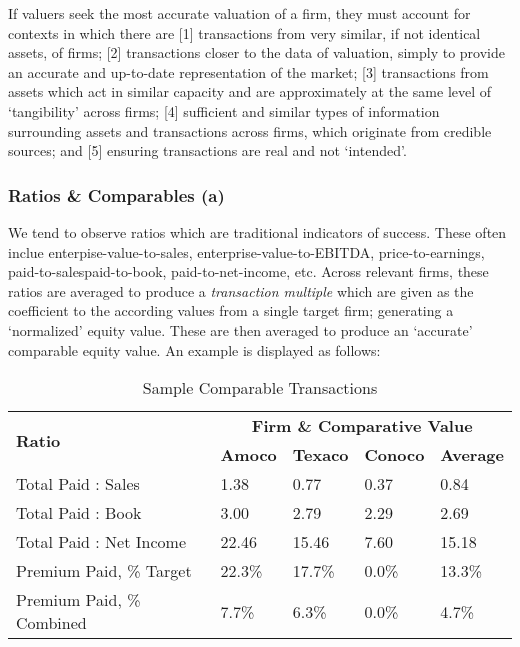 \documentclass[11pt, english]{article}
\begin{document}
	If valuers seek the most accurate valuation of a firm, they must account for contexts in which there are [1] transactions from very similar, if not identical assets, of firms; [2] transactions closer to the data of valuation, simply to provide an accurate and up-to-date representation of the market; [3] transactions from assets which act in similar capacity and are approximately at the same level of `tangibility' across firms; [4] sufficient and similar types of information surrounding assets and transactions across firms, which originate from credible sources; and [5] ensuring transactions are real and not `intended'.

		\subsubsection*{Ratios \& Comparables (a)}
	
	We tend to observe ratios which are traditional indicators of success. These often inclue enterpise-value-to-sales, enterprise-value-to-EBITDA, price-to-earnings, paid-to-salespaid-to-book, paid-to-net-income, etc. Across relevant firms, these ratios are averaged to produce a \textit{transaction multiple} which are given as the coefficient to the according values from a single target firm; generating a `normalized' equity value. These are then averaged to produce an `accurate' comparable equity value. An example is displayed as follows:
	
	\begin{table}[h]
		\scriptsize
		\renewcommand{\arraystretch}{1.25}
	\begin{center}
	\begin{tabular}{p{4cm}|p{2cm}p{2cm}p{2cm}|p{2cm}}
		\multirow{2}{*}{\textbf{Ratio}} & \multicolumn{4}{c}{\textbf{Firm \& Comparative Value}}\\
		\cline{2-5}
		& \textbf{Amoco} & \textbf{Texaco} & \textbf{Conoco} & \textbf{Average}\\
		\hline
		Total Paid : Sales & 1.38 & 0.77 & 0.37 & 0.84\\
		Total Paid : Book & 3.00 & 2.79 & 2.29 & 2.69\\
		Total Paid : Net Income & 22.46 & 15.46 & 7.60 & 15.18\\
		Premium Paid, \% Target & 22.3\% & 17.7\% & 0.0\% & 13.3\%\\
		Premium Paid, \% Combined & 7.7\% & 6.3\% & 0.0\% & 4.7\%\\
		\hline
	\end{tabular}
		\caption{Sample Comparable Transactions}
	\end{center}
	\end{table}
\end{document}
